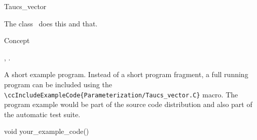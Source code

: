 

\begin{ccRefClass}{Taucs_vector}  %


\ccDefinition
  
The class \ccRefName\ does this and that.


\ccIsModel

Concept

\ccTypes


\ccCreation
{}  %


\ccOperations


\ccSeeAlso

,
.

\ccExample

A short example program.
Instead of a short program fragment, a full running program can be
included using the 
\verb|\ccIncludeExampleCode{Parameterization/Taucs_vector.C}| 
macro. The program example would be part of the source code distribution and
also part of the automatic test suite.

\begin{ccExampleCode}
void your_example_code() {
}
\end{ccExampleCode}


\end{ccRefClass}


